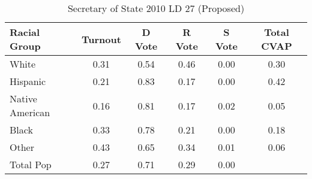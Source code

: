\begin{table}[htb]
\begin{center}
\caption{Secretary of State 2010 LD 27 (Proposed)}
\label{sos10_cvap_ld_27}
\begin{tabular}{lccccc}
  \hline
Racial Group & Turnout & D Vote & R Vote & S Vote & Total CVAP \\ 
  \hline
White & 0.31 & 0.54 & 0.46 & 0.00 & 0.30 \\ 
  Hispanic & 0.21 & 0.83 & 0.17 & 0.00 & 0.42 \\ 
  Native American & 0.16 & 0.81 & 0.17 & 0.02 & 0.05 \\ 
  Black & 0.33 & 0.78 & 0.21 & 0.00 & 0.18 \\ 
  Other & 0.43 & 0.65 & 0.34 & 0.01 & 0.06 \\ 
  Total Pop & 0.27 & 0.71 & 0.29 & 0.00 &  \\ 
   \hline
\end{tabular}
\end{center}
\end{table}
